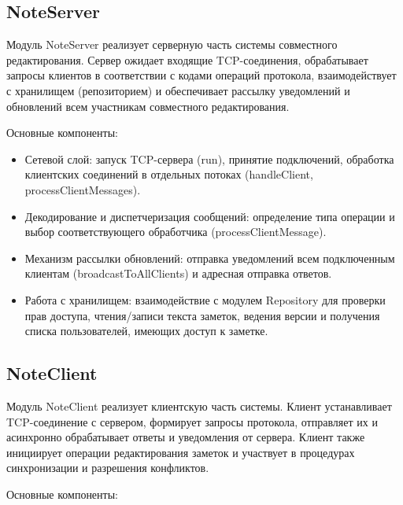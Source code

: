 \subsection*{NoteServer}

Модуль NoteServer реализует серверную часть системы совместного редактирования. Сервер ожидает входящие TCP-соединения, обрабатывает запросы клиентов в соответствии с кодами операций протокола, взаимодействует с хранилищем (репозиторием) и обеспечивает рассылку уведомлений и обновлений всем участникам совместного редактирования.

Основные компоненты:

\begin{itemize}
    \item Сетевой слой: запуск TCP-сервера (run), принятие подключений, обработка клиентских соединений в отдельных потоках (handleClient, processClientMessages).
    \item Декодирование и диспетчеризация сообщений: определение типа операции и выбор соответствующего обработчика (processClientMessage).
    \item Механизм рассылки обновлений: отправка уведомлений всем подключенным клиентам (broadcastToAllClients) и адресная отправка ответов.
    \item Работа с хранилищем: взаимодействие с модулем Repository для проверки прав доступа, чтения/записи текста заметок, ведения версии и получения списка пользователей, имеющих доступ к заметке.
\end{itemize}


\subsection*{NoteClient}

Модуль NoteClient реализует клиентскую часть системы. Клиент устанавливает TCP-соединение с сервером, формирует запросы протокола, отправляет их и асинхронно обрабатывает ответы и уведомления от сервера. Клиент также инициирует операции редактирования заметок и участвует в процедурах синхронизации и разрешения конфликтов.

Основные компоненты:

